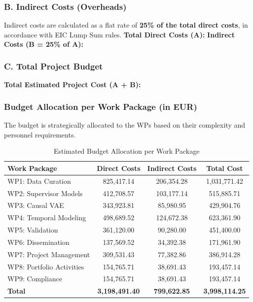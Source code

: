 \documentclass[11pt, a4paper]{article}
\begin{document}
\subsubsection*{B. Indirect Costs (Overheads)}
Indirect costs are calculated as a flat rate of \textbf{25\% of the total direct costs}, in accordance with EIC Lump Sum rules.
\textbf{Total Direct Costs (A): }
\textbf{Indirect Costs (B = 25\% of A): }

\subsubsection*{C. Total Project Budget}
\textbf{Total Estimated Project Cost (A + B): }

\subsubsection*{Budget Allocation per Work Package (in EUR)}
The budget is strategically allocated to the WPs based on their complexity and personnel requirements.
\begin{table}[H]
\centering
\caption{Estimated Budget Allocation per Work Package}
\label{tab:budget_wp}
\begin{tabular}{lS[table-format=7.2]S[table-format=7.2]S[table-format=7.2]}
\toprule
\textbf{Work Package} & {\textbf{Direct Costs}} & {\textbf{Indirect Costs}} & {\textbf{Total Cost}} \\
\midrule
WP1: Data Curation & 825,417.14 & 206,354.28 & 1,031,771.42 \\
WP2: Supervisor Models & 412,708.57 & 103,177.14 & 515,885.71 \\
WP3: Causal VAE & 343,923.81 & 85,980.95 & 429,904.76 \\
WP4: Temporal Modeling & 498,689.52 & 124,672.38 & 623,361.90 \\
WP5: Validation & 361,120.00 & 90,280.00 & 451,400.00 \\
WP6: Dissemination & 137,569.52 & 34,392.38 & 171,961.90 \\
WP7: Project Management & 309,531.43 & 77,382.86 & 386,914.28 \\
WP8: Portfolio Activities & 154,765.71 & 38,691.43 & 193,457.14 \\
WP9: Compliance & 154,765.71 & 38,691.43 & 193,457.14 \\
\midrule
\textbf{Total} & \textbf{3,198,491.40} & \textbf{799,622.85} & \textbf{3,998,114.25} \\
\bottomrule
\end{tabular}
\end{table}
\end{document}
